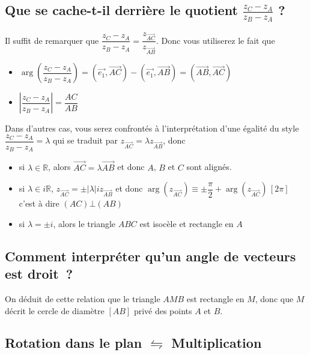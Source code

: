 \documentclass[french]{book}
\newcommand{\bbr}{\mathbb {R}}
\newcommand{\fr}[2]{\dfrac{#1}{#2}}
\newcommand{\ve}[1]{\overrightarrow{#1}}
\newcommand{\pa}[1]{(#1)}
\newcommand{\la}{\lambda}
\begin{document}
\subsection{Que     se     cache-t-il     derrière    le     quotient  $ \frac{z_C-z_A}{z_B-z_A} $ ?} 

Il             suffit            de             remarquer            que
$\fr{z_C-z_A}{z_B-z_A}=\fr{z_{\ve{AC}}}{z_{\ve{AB}}}$.     Donc     vous
utiliserez le fait que \begin{itemize} 
\item[$\bullet$] $\arg(\fr{z_C-z_A}{z_B-z_A})=(\ve{e_1},\ve{AC})-(\ve{e_1},\ve{AB})=(\ve{AB},\ve{AC})$
\item[$\bullet$] $\left|\fr{z_C-z_A}{z_B-z_A}\right|=\fr{AC}{AB}$
\end{itemize}



Dans  d'autres  cas,  vous  serez confrontés  à  l'interprétation  d'une
égalité du style $\fr{z_C-z_A}{z_B-z_A}=\la$ qui se traduit par 
$z_{\ve{AC}}=\la z_{\ve{AB}}$, donc \begin{itemize} 
\item[$\bullet$] si  $\la\in\bbr$, alors $\ve{AC}=\la\ve{AB}$  et donc $A$,  $B$ et
  $C$ sont alignés.  
\item[$\bullet$]  si  $\la\in  i\bbr$, $z_{\ve{AC}}=\pm|\la|iz_{\ve{AB}}$  et  donc
  $\arg\pa{z_{\ve{AC}}}\equiv\pm\fr{\pi}{2}+\arg\pa{z_{\ve{AC}}}\,[2\pi]$
  c'est à dire $(AC)\bot(AB)$ 
\item[$\bullet$] si $\la=\pm i$, alors le triangle $ABC$ est isocèle et rectangle en $A$ 

\end{itemize}



\subsection{Comment interpréter qu'un angle de vecteurs est droit~? } 

On  déduit de cette relation que le triangle
$AMB$ est  rectangle en $M$, donc  que $M$ décrit le  cercle de diamètre
$[AB]$ privé des points $A$ et $B$. 


\subsection{Rotation dans le plan  $ \leftrightharpoons $ Multiplication}
\end{document}
